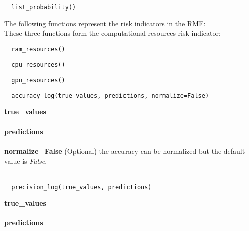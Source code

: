 \begin{lstlisting}
  list_probability()
\end{lstlisting}

The following functions represent the risk indicators in the RMF: \\
These three functions form the computational resources risk indicator: \\
\begin{lstlisting}
  ram_resources()
\end{lstlisting}

\begin{lstlisting}
  cpu_resources()
\end{lstlisting}

\begin{lstlisting}
  gpu_resources()
\end{lstlisting}

\begin{lstlisting}
  accuracy_log(true_values, predictions, normalize=False)
\end{lstlisting}

\noindent\textbf{true\_values}
\\ \\
\textbf{predictions}
\\ \\
\textbf{normalize=False}
(Optional) the accuracy can be normalized but the default value is \textit{False}. \\ \\

\begin{lstlisting}
  precision_log(true_values, predictions)
\end{lstlisting}

\noindent\textbf{true\_values}
\\ \\
\textbf{predictions}
\\ \\
